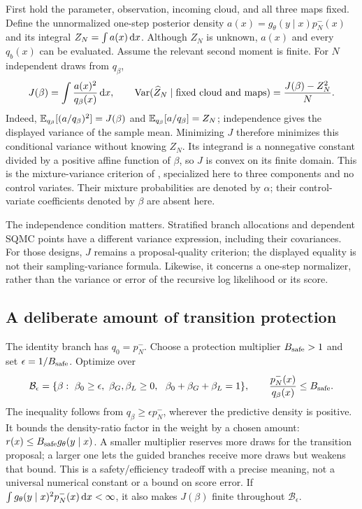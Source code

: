 First hold the parameter, observation, incoming cloud, and all three maps
fixed. Define the unnormalized one-step posterior density
\(a(x)=g_\theta(y\mid x)p_N^-(x)\) and its integral \(Z_N=\int a(x)\,\mathrm d x\).
Although \(Z_N\) is unknown, \(a(x)\) and every \(q_b(x)\) can be evaluated.
Assume the relevant second moment is finite. For \(N\) independent draws
from \(q_\beta\),
\begin{equation}
\label{eq:bf-covariance-proposal-beta-second-moment}
 J(\beta)=\int\frac{a(x)^2}{q_\beta(x)}\,\mathrm d x,
 \qquad
 \operatorname{Var}(\widehat Z_N\mid\hbox{fixed cloud and maps})
 =\frac{J(\beta)-Z_N^2}{N}.
\end{equation}
Indeed, \(\mathbb E_{q_\beta}[(a/q_\beta)^2]=J(\beta)\) and
\(\mathbb E_{q_\beta}[a/q_\beta]=Z_N\); independence gives the displayed variance
of the sample mean. Minimizing \(J\) therefore minimizes this conditional
variance without knowing \(Z_N\). Its integrand is a nonnegative constant
divided by a positive affine function of \(\beta\), so \(J\) is convex on
its finite domain. This is the mixture-variance criterion of
\citet[Theorem~3, Section~4, equation~(15), and proof in
Section~7.5]{HeOwen2014mixture}, specialized here to three components and no
control variates. Their mixture probabilities are denoted by \(\alpha\);
their control-variate coefficients denoted by \(\beta\) are absent here.

The independence condition matters. Stratified branch allocations and
dependent SQMC points have a different variance expression, including their
covariances. For those designs, \(J\) remains a proposal-quality criterion;
the displayed equality is not their sampling-variance formula. Likewise,
it concerns a one-step normalizer, rather than the variance or error of the
recursive log likelihood or its score.

\subsection{A deliberate amount of transition protection}

The identity branch has \(q_0=p_N^-\). Choose a protection multiplier
\(B_{\rm safe}>1\) and set \(\epsilon=1/B_{\rm safe}\). Optimize over
\begin{equation}
\label{eq:bf-covariance-proposal-beta-feasible}
 \mathcal B_\epsilon
 =\{\beta:\ \beta_0\geq\epsilon,\ \beta_G,\beta_L\geq0,\
                     \ \beta_0+\beta_G+\beta_L=1\},\qquad
 \frac{p_N^-(x)}{q_\beta(x)}\leq B_{\rm safe}.
\end{equation}
The inequality follows from \(q_\beta\geq\epsilon p_N^-\), wherever the
predictive density is positive. It bounds the density-ratio factor in the
weight by a chosen amount: \(r(x)\leq B_{\rm safe}g_\theta(y\mid x)\).
A smaller multiplier reserves more draws for the transition proposal; a
larger one lets the guided branches receive more draws but weakens that
bound. This is a safety/efficiency tradeoff with a precise meaning, not a
universal numerical constant or a bound on score error. If
\(\int g_\theta(y\mid x)^2p_N^-(x)\,\mathrm d x<\infty\), it also makes
\(J(\beta)\) finite throughout \(\mathcal B_\epsilon\).

